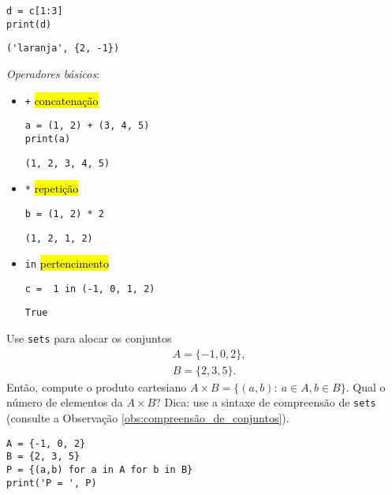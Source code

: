 \begin{lstlisting}
d = c[1:3]
print(d)
\end{lstlisting}

\begin{verbatim}
('laranja', {2, -1})
\end{verbatim}

\emph{Operadores básicos}:

\begin{itemize}
\item[] \texttt{+} \hl{concatenação}

\begin{lstlisting}
a = (1, 2) + (3, 4, 5)
print(a)
\end{lstlisting}

\begin{verbatim}
(1, 2, 3, 4, 5)
\end{verbatim}

\item[] \texttt{*} \hl{repetição}

\begin{lstlisting}
b = (1, 2) * 2
\end{lstlisting}

\begin{verbatim}
(1, 2, 1, 2)
\end{verbatim}

\item[] \texttt{in} \hl{pertencimento}

\begin{lstlisting}
c =  1 in (-1, 0, 1, 2)
\end{lstlisting}

\begin{verbatim}
True
\end{verbatim}

\end{itemize}

\begin{exer}
  Use \texttt{sets} para alocar os conjuntos
  \begin{align}
    &A = \{-1, 0, 2\},\\
    &B = \{2, 3, 5\}.
  \end{align}
  Então, compute o produto cartesiano $A\times B=\{(a,b):~a\in A, b\in B\}$. Qual o número de elementos da $A\times B$? Dica: use a sintaxe de compreensão de \texttt{sets} (consulte a Observação \ref{obs:compreensão_de_conjuntos}).
\end{exer}
\begin{resp}

\begin{lstlisting}
A = {-1, 0, 2}
B = {2, 3, 5}
P = {(a,b) for a in A for b in B}
print('P = ', P)
\end{lstlisting}

\end{resp}

